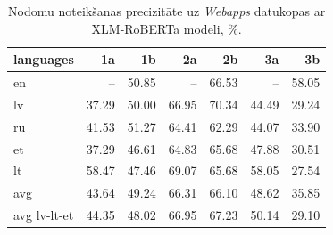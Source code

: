 \begin{table}[htbp]
  \centering
  \caption{Nodomu noteikšanas precizitāte uz \textit{Webapps} datukopas ar XLM-RoBERTa modeli, \%.}
    \begin{tabular}{lrrrrrr}\toprule
    languages & 1a & 1b & 2a & 2b & 3a & 3b \\\midrule
    en    &   --    & \cellcolor[rgb]{ .965,  .973,  .992}50.85 &  --   & \cellcolor[rgb]{ .475,  .627,  .82}66.53 &   --    & \cellcolor[rgb]{ .737,  .812,  .914}58.05 \\
    lv    & \cellcolor[rgb]{ .976,  .659,  .671}37.29 & \cellcolor[rgb]{ .988,  .988,  1}50.00 & \cellcolor[rgb]{ .463,  .62,  .816}66.95 & \cellcolor[rgb]{ .353,  .541,  .776}70.34 & \cellcolor[rgb]{ .984,  .843,  .855}44.49 & \cellcolor[rgb]{ .973,  .455,  .463}29.24 \\
    ru    & \cellcolor[rgb]{ .98,  .769,  .78}41.53 & \cellcolor[rgb]{ .949,  .961,  .988}51.27 & \cellcolor[rgb]{ .541,  .675,  .843}64.41 & \cellcolor[rgb]{ .608,  .722,  .867}62.29 & \cellcolor[rgb]{ .98,  .835,  .843}44.07 & \cellcolor[rgb]{ .976,  .573,  .58}33.90 \\
    et    & \cellcolor[rgb]{ .976,  .659,  .671}37.29 & \cellcolor[rgb]{ .984,  .898,  .91}46.61 & \cellcolor[rgb]{ .525,  .663,  .839}64.83 & \cellcolor[rgb]{ .502,  .647,  .831}65.68 & \cellcolor[rgb]{ .984,  .933,  .945}47.88 & \cellcolor[rgb]{ .973,  .486,  .494}30.51 \\
    lt    & \cellcolor[rgb]{ .725,  .804,  .91}58.47 & \cellcolor[rgb]{ .984,  .922,  .933}47.46 & \cellcolor[rgb]{ .396,  .573,  .792}69.07 & \cellcolor[rgb]{ .502,  .647,  .831}65.68 & \cellcolor[rgb]{ .737,  .812,  .914}58.05 & \cellcolor[rgb]{ .973,  .412,  .42}27.54 \\\midrule
    avg   & \cellcolor[rgb]{ .98,  .824,  .835}43.64 & \cellcolor[rgb]{ .984,  .969,  .976}49.24 & \cellcolor[rgb]{ .482,  .631,  .824}66.31 & \cellcolor[rgb]{ .486,  .635,  .824}66.10 & \cellcolor[rgb]{ .984,  .949,  .961}48.62 & \cellcolor[rgb]{ .976,  .624,  .631}35.85 \\
    avg lv-lt-et & \cellcolor[rgb]{ .98,  .843,  .851}44.35 & \cellcolor[rgb]{ .984,  .937,  .945}48.02 & \cellcolor[rgb]{ .463,  .62,  .816}66.95 & \cellcolor[rgb]{ .451,  .612,  .812}67.23 & \cellcolor[rgb]{ .984,  .988,  1}50.14 & \cellcolor[rgb]{ .973,  .451,  .459}29.10 \\\bottomrule
    \end{tabular}%
  \label{tab:webapps-xml}%
\end{table}%




